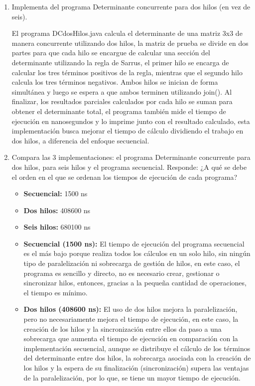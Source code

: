 \begin{enumerate}
    \hfill
    
    \item Implementa del programa Determinante concurrente para dos hilos (en vez de seis).

    El programa DCdosHilos.java calcula el determinante de una matriz 3x3 de manera concurrente utilizando dos hilos, la matriz de prueba se divide en dos partes      para que cada hilo se encargue de calcular una sección del determinante utilizando la regla de Sarrus, el primer hilo se encarga de calcular los tres términos     positivos de la regla, mientras que el segundo hilo calcula los tres términos negativos. Ambos hilos se inician de forma simultánea y luego se espera a que        ambos terminen utilizando join(). Al finalizar, los resultados parciales calculados por cada hilo se suman para obtener el determinante total, el programa         también mide el tiempo de ejecución en nanosegundos y lo imprime junto con el resultado calculado, esta implementación busca mejorar el tiempo de cálculo          dividiendo el trabajo en dos hilos, a diferencia del enfoque secuencial.

    \hfill

    \item Compara las 3 implementaciones: el programa Determinante concurrente para dos hilos, para seis hilos y el programa secuencial. Responde: ¿A qué se debe el orden en el que se ordenan los tiempos de ejecución de cada programa?

    \begin{itemize}
        \item \textbf{Secuencial:} 1500 ns
        \item \textbf{Dos hilos:} 408600 ns
        \item \textbf{Seis hilos:} 680100 ns
    \end{itemize}

    \begin{itemize}
        \item \textbf{Secuencial (1500 ns):} El tiempo de ejecución del programa secuencial es el más bajo porque realiza todos los cálculos en un solo hilo, sin            ningún tipo de paralelización ni sobrecarga de gestión de hilos, en este caso, el programa es sencillo y directo, no es necesario crear, gestionar o                sincronizar hilos, entonces, gracias a la pequeña cantidad de operaciones, el tiempo es mínimo.
    
        \item \textbf{Dos hilos (408600 ns):} El uso de dos hilos mejora la paralelización, pero no necesariamente mejora el tiempo de ejecución, en este caso, la           creación de los hilos y la sincronización entre ellos da paso a una sobrecarga que aumenta el tiempo de ejecución en comparación con la implementación              secuencial, aunque se distribuye el cálculo de los términos del determinante entre dos hilos, la sobrecarga asociada con la creación de los hilos y la              espera de su finalización (sincronización) supera las ventajas de la paralelización, por lo que, se tiene un mayor tiempo de ejecución.
    

\end{itemize}
\end{enumerate}

